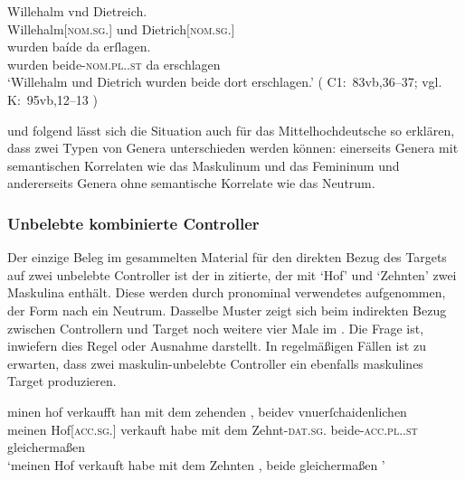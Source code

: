 \begin{exe}
\ex\label{ex:dietwill3}
		\gll Willehalm vnd Dietreich. \\
			Willehalm[\textsc{nom.sg.\MascM}] und Dietrich[\textsc{nom.sg.\MascM}] \\
	\sn \gll wurden baíde da erſlagen. \\
			wurden beide-\textsc{nom.pl.\MascM.st} da erschlagen \\
		\trans `Willehalm und Dietrich wurden beide dort erschlagen.'
			(%
				C1:~83vb,36--37; vgl.
				K:~95vb,12--13%
			)
\end{exe}

\citet[576]{wechsler2009} und \citet[182]{wechslerzlatic2003} folgend lässt
sich die Situation auch für das Mittelhochdeutsche so
erklären, dass zwei Typen von Genera unterschieden werden können:
einerseits Genera mit semantischen Korrelaten wie das Maskulinum und
das Femininum und andererseits Genera ohne semantische Korrelate wie
das Neutrum.


\subsubsection{Unbelebte kombinierte Controller}
\label{subsubsec:x+x_dir_inan}

Der einzige Beleg im gesammelten Material für den direkten Bezug des
Targets auf zwei unbelebte Controller ist der in
 zitierte, der mit  `Hof' und 
`Zehnten' zwei Maskulina enthält. Diese werden durch pronominal verwendetes
 aufgenommen, der Form nach ein Neutrum. Dasselbe Muster zeigt sich
beim indirekten Bezug zwischen Controllern und Target noch weitere vier Male im
\CAO{}. Die Frage ist, inwiefern dies Regel oder Ausnahme
darstellt. In regelmäßigen Fällen ist zu erwarten, dass zwei maskulin-unbelebte
Controller ein ebenfalls maskulines Target produzieren.

\begin{exe}
\ex\label{ex:hofzehntbeidiu}
	\gll minen hof \textelp{} verkaufft han mit dem
			zehenden \textelp{}, beidev vnuerſchaidenlichen
			\\
			meinen Hof[\textsc{acc.sg.\MascI}] {} verkauft habe mit dem
			Zehnt-\textsc{dat.sg.\MascI} {} beide-\textsc{acc.pl.\NeutI.st}
			gleichermaßen
			\\
	\trans `meinen Hof verkauft habe mit dem Zehnten \textelp{}, beide
		gleichermaßen%
		'
		\parencites(Nr.~N~241, Augsburg, 1283)[195,37--39]{cao5}
\end{exe}


